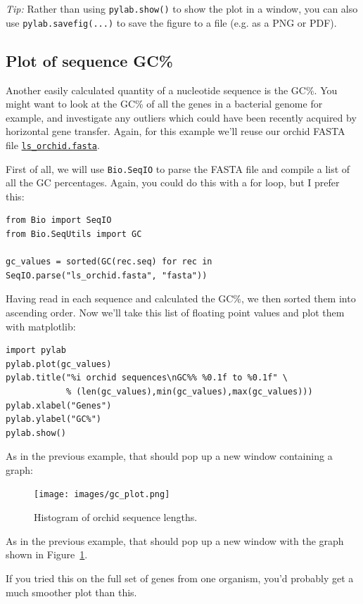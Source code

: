 \documentclass{report}
\begin{document}
\emph{Tip:} Rather than using \verb|pylab.show()| to show the plot in a window, you can also use \verb|pylab.savefig(...)| to save the figure to a file (e.g. as a PNG or PDF).

\subsection{Plot of sequence GC\%}

Another easily calculated quantity of a nucleotide sequence is the GC\%.  You might
want to look at the GC\% of all the genes in a bacterial genome for example, and
investigate any outliers which could have been recently acquired by horizontal gene
transfer.  Again, for this example we'll reuse our orchid FASTA file \href{http://biopython.org/DIST/docs/tutorial/examples/ls_orchid.fasta}{\tt ls\_orchid.fasta}.

First of all, we will use \verb|Bio.SeqIO| to parse the FASTA file and compile a list
of all the GC percentages.  Again, you could do this with a for loop, but I prefer this:

\begin{verbatim}
from Bio import SeqIO
from Bio.SeqUtils import GC

gc_values = sorted(GC(rec.seq) for rec in SeqIO.parse("ls_orchid.fasta", "fasta"))
\end{verbatim}

Having read in each sequence and calculated the GC\%, we then sorted them into ascending
order. Now we'll take this list of floating point values and plot them with matplotlib:

\begin{verbatim}
import pylab
pylab.plot(gc_values)
pylab.title("%i orchid sequences\nGC%% %0.1f to %0.1f" \
            % (len(gc_values),min(gc_values),max(gc_values)))
pylab.xlabel("Genes")
pylab.ylabel("GC%")
pylab.show()
\end{verbatim}

%
%
\begin{htmlonly}
\noindent As in the previous example, that should pop up a new window containing a graph:


\end{htmlonly}
%
%
\begin{latexonly}
\begin{figure}[htbp]
\centering
\texttt{[image: images/gc\_plot.png]}
\caption{Histogram of orchid sequence lengths.}
\label{fig:seq-gc-plot}
\end{figure}
\noindent As in the previous example, that should pop up a new window with the graph shown in Figure~\ref{fig:seq-gc-plot}.
\end{latexonly}
%
%
If you tried this on the full set of genes from one organism, you'd probably get a much
smoother plot than this.
\end{document}
